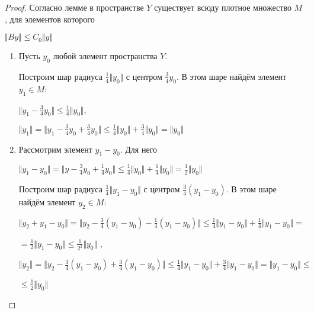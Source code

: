 \documentclass[12pt,a4paper,titlepage,oneside]{book}
\theoremstyle{definition}
\theoremstyle{plain}
\theoremstyle{remark}
\theoremstyle{remark}
\theoremstyle{remark}
\theoremstyle{remark}
\theoremstyle{plain}
\theoremstyle{plain}
\begin{document}
\begin{proof}
Согласно лемме в пространстве $Y$ существует всюду плотное множество $M$, для элементов которого
\begin{center}
	$\Vert By \Vert \leqslant C_0 \Vert y \Vert $
\end{center}
\begin{enumerate}

	\item Пусть $y_0$ любой элемент пространства $Y$.
	
	Построим шар радиуса $\frac{1}{4}\Vert y_0 \Vert$ с 		центром $\frac{3}{4}y_0$. В этом шаре найдём элемент
	$y_1 \in M$:
	\begin{center}
	$\Vert y_1 - \frac{3}{4}y_0\Vert \leqslant \frac{1}{4}    		\Vert y_0 \Vert $,
	\end{center}
	\begin{center}
	$\Vert y_1 \Vert =
	\Vert y_1 - \frac{3}{4}y_0 +
	\frac{3}{4}y_0 \Vert \leqslant \frac{1}{4} 			\Vert y_0 \Vert +
	 \frac{3}{4}\Vert y_0\Vert = 				\Vert y_0 \Vert$
	\end{center}
	
	\item Рассмотрим элемент $y_1 - y_0$. Для него
	\begin{center}
	$\Vert y_1-y_0 \Vert =\Vert y - \frac{3}{4}y_0 +
	\frac{1}{4}y_0 \Vert \leqslant
	\frac{1}{4} \Vert y_0 \Vert +
	\frac{1}{4} \Vert y_0 \Vert =
	\frac{1}{2} \Vert y_0 \Vert$
	\end{center}
	Построим шар радиуса $\frac{1}{4} \Vert 		y_1 - y_0 \Vert$ с центром $\frac{3}{4} (y_1 - y_0)$. В этом шаре найдём элемент $y_2 \in M$:
	\begin{center}
	$\Vert y_2 + y_1 - y_0 \Vert =
	\Vert y_2 - \frac{3}{4}(y_1 - y_0) -
	\frac{1}{4}(y_1 - y_0) \Vert \leqslant
	\frac{1}{4} \Vert y_1 - y_0 \Vert +
	\frac{1}{4} \Vert y_1 - y_0 \Vert = $
	\end{center}
	\begin{center}
	$ = \frac{1}{2} \Vert y_1 - y_0 \Vert 			\leqslant
	\frac{1}{2^2} \Vert y_0 \Vert$ ,
	\end{center}
	\begin{center}
	$\Vert y_2 \Vert =
	\Vert y_2 - \frac{3}{4}(y_1 - y_0) +
	\frac{3}{4}(y_1 - y_0) \Vert \leqslant
	\frac{1}{4} \Vert y_1 - y_0 \Vert +
	\frac{3}{4} \Vert y_1 - y_0 \Vert =
	 \Vert y_1 - y_0 \Vert \leqslant$
	 \end{center}
	\begin{center}
	 $ \leqslant \frac{1}{2} \Vert y_0 \Vert$
	\end{center}
	

\end{enumerate}
\end{proof}
\end{document}

